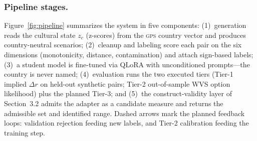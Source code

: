 \documentclass[11pt,letterpaper]{article}
\newcommand{\GPS}{\textsc{gps}}
\begin{document}
\subsubsection{Pipeline stages.}
Figure~\ref{fig:pipeline} summarizes the system in five components: (1)~generation reads the cultural state $z_c$ (z-scores) from the \GPS{} country vector and produces country-neutral scenarios; (2)~cleanup and labeling score each pair on the six dimensions (monotonicity, distance, contamination) and attach sign-based labels; (3)~a student model is fine-tuned via QLoRA with unconditioned prompts---the country is never named; (4)~evaluation runs the two executed tiers (Tier-1 implied $\Delta r$ on held-out synthetic pairs; Tier-2 out-of-sample WVS option likelihood) plus the planned Tier-3; and (5)~the construct-validity layer of Section~3.2 admits the adapter as a candidate measure and returns the admissible set and identified range. Dashed arrows mark the planned feedback loops: validation rejection feeding new labels, and Tier-2 calibration feeding the training step.
\end{document}
